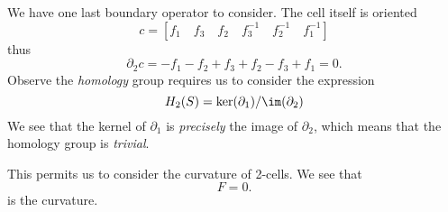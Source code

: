 We have one last boundary operator to consider. The cell itself
is oriented
\begin{equation}%
c = [f_{1} \quad f_{3} \quad f_{2} \quad f^{-1}_{3}\quad f^{-1}_{2}\quad f^{-1}_{1}]
\end{equation}
thus
\begin{equation}%
\partial_{2}c = -f_{1}-f_{2}+f_{3}+f_{2}-f_{3}+f_{1} = 0.
\end{equation}
Observe the \emph{homology} group requires us to consider the
expression
\begin{equation}%
H_{2}(S) = \ker(\partial_{1})/\im(\partial_{2})
\end{equation}
We see that the kernel of $\partial_{1}$ is \emph{precisely} the
image of $\partial_{2}$, which means that the homology group is
\emph{trivial}.

This permits us to consider the curvature of 2-cells. We see that
\begin{equation}%
F = 0.
\end{equation}
is the curvature.
